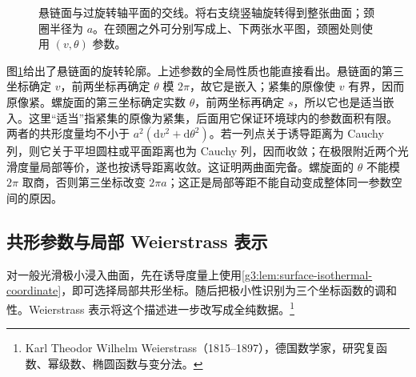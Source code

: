 \begin{figure}[htbp]
	\centering
	
	\caption{悬链面与过旋转轴平面的交线。将右支绕竖轴旋转得到整张曲面；颈圈半径为 \(a\)。在颈圈之外可分别写成上、下两张水平图，颈圈处则使用 \((v,\theta)\) 参数。}
	\label{g3:fig:catenoid-profile}
\end{figure}

图\ref{g3:fig:catenoid-profile}给出了悬链面的旋转轮廓。上述参数的全局性质也能直接看出。悬链面的第三坐标确定 \(v\)，前两坐标再确定 \(\theta\) 模 \(2\pi\)，故它是嵌入；紧集的原像使 \(v\) 有界，因而原像紧。螺旋面的第三坐标确定实数 \(\theta\)，前两坐标再确定 \(s\)，所以它也是适当嵌入。这里“适当”指紧集的原像为紧集，后面用它保证环境球内的参数面积有限。
\ProseParagraphBreak
两者的共形度量均不小于 \(a^2(\mathrm dv^2+\mathrm d\theta^2)\)。若一列点关于诱导距离为 Cauchy 列，则它关于平坦圆柱或平面距离也为 Cauchy 列，因而收敛；在极限附近两个光滑度量局部等价，遂也按诱导距离收敛。这证明两曲面完备。螺旋面的 \(\theta\) 不能模 \(2\pi\) 取商，否则第三坐标改变 \(2\pi a\)；这正是局部等距不能自动变成整体同一参数空间的原因。

\subsection{共形参数与局部 Weierstrass 表示}
\label{g3:subsec:1902:04}
对一般光滑极小浸入曲面，先在诱导度量上使用\cref{g3:lem:surface-isothermal-coordinate}，即可选择局部共形坐标。随后把极小性识别为三个坐标函数的调和性。Weierstrass 表示将这个描述进一步改写成全纯数据。\footnote{Karl Theodor Wilhelm Weierstrass（1815--1897），德国数学家，研究复函数、幂级数、椭圆函数与变分法。}

